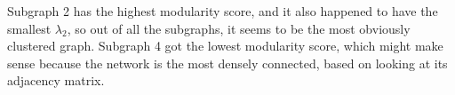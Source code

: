 \documentclass[11pt]{article}
\begin{document}
Subgraph 2 has the highest modularity score, and it also happened to have the smallest $\lambda_2$, so out of all the subgraphs, it seems to be the most obviously clustered graph. Subgraph 4 got the lowest modularity score, which might make sense because the network is the most densely connected, based on looking at its adjacency matrix.
     
\end{document}

